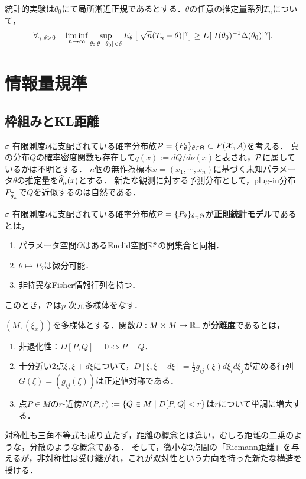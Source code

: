 \documentclass[uplatex,dvipdfmx]{jsreport}
\begin{document}
\begin{theorem}
    統計的実験は$\theta_0$にて局所漸近正規であるとする．$\theta$の任意の推定量系列$T_n$について，
    \[\forall_{\gamma,\delta>0}\quad\liminf_{n\to\infty}\sup_{\theta:\abs{\theta-\theta_0}<\delta}E_\theta\Square{\abs{\sqrt{n}(T_n-\theta)}^\gamma}\ge E[\abs{I(\theta_0)^{-1}\Delta(\theta_0)}^\gamma].\]
\end{theorem}

\section{情報量規準}

\subsection{枠組みとKL距離}

\begin{notation}
    $\sigma$-有限測度$\nu$に支配されている確率分布族$\P=\{P_\theta\}_{\theta\in\Theta}\subset P(\X,\A)$を考える．
    真の分布$Q$の確率密度関数も存在して$q(x):=dQ/d\nu(x)$と表され，$\P$に属しているかは不明とする．
    $n$個の無作為標本$x=(x_1,\cdots,x_n)$に基づく未知パラメータ$\theta$の推定量を$\wh{\theta}_n(x)$とする．
    新たな観測に対する予測分布として，plug-in分布$P_{\wh{\theta}_n}$で$Q$を近似するのは自然である．
\end{notation}

\begin{definition}
    $\sigma$-有限測度$\nu$に支配されている確率分布族$\P=\{P_\theta\}_{\theta\in\Theta}$が\textbf{正則統計モデル}であるとは，
    \begin{enumerate}
        \item パラメータ空間$\Theta$はあるEuclid空間$\R^p$の開集合と同相．
        \item $\theta\mapsto P_\theta$は微分可能．
        \item 非特異なFisher情報行列を持つ．
    \end{enumerate}
    このとき，$\P$は$p$-次元多様体をなす．
\end{definition}

\begin{definition}[divergence]
    $(M,(\xi_x))$を多様体とする．関数$D:M\times M\to\R_+$が\textbf{分離度}であるとは，
    \begin{enumerate}
        \item 非退化性：$D[P,Q]=0\Leftrightarrow P=Q$．
        \item 十分近い2点$\xi,\xi+d\xi$について，$D[\xi,\xi+d\xi]=\frac{1}{2}g_{ij}(\xi)d\xi_id\xi_j$が定める行列$G(\xi)=(g_{ij}(\xi))$は正定値対称である．
        \item 点$P\in M$の$r$-近傍$N(P,r):=\Brace{Q\in M\mid D[P,Q]<r}$は$r$について単調に増大する．
    \end{enumerate}
\end{definition}
\begin{remarks}
    対称性も三角不等式も成り立たず，距離の概念とは違い，むしろ距離の二乗のような，分散のような概念である．
    そして，微小な2点間の「Riemann距離」を与えるが，非対称性は受け継がれ，これが双対性という方向を持った新たな構造を授ける．
\end{remarks}
\end{document}

